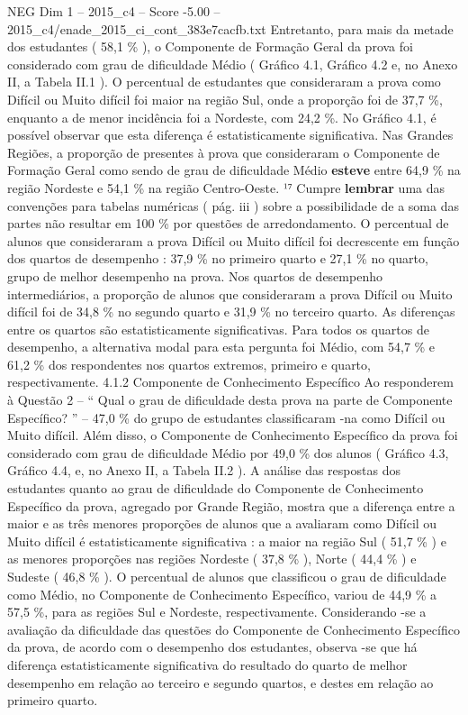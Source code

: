 \begin{textsample}{NEG Dim 1 – 2015\_c4 – Score -5.00 – 2015\_c4/enade\_2015\_ci\_cont\_383e7cacfb.txt}
Entretanto, para mais da metade dos estudantes ( 58,1 \% ), o Componente de Formação Geral da prova foi considerado com grau de dificuldade Médio ( Gráfico 4.1, Gráfico 4.2 e, no Anexo II, a Tabela II.1 ).
O percentual de estudantes que consideraram a prova como Difícil ou Muito difícil foi maior na região Sul, onde a proporção foi de 37,7 \%, enquanto a de menor incidência foi a Nordeste, com 24,2 \%.
No Gráfico 4.1, é possível observar que esta diferença é estatisticamente significativa.
Nas Grandes Regiões, a proporção de presentes à prova que consideraram o Componente de Formação Geral como sendo de grau de dificuldade Médio \textbf{esteve} entre 64,9 \% na região Nordeste e 54,1 \% na região Centro-Oeste. ¹⁷ Cumpre \textbf{lembrar} uma das convenções para tabelas numéricas ( pág. iii ) sobre a possibilidade de a soma das partes não resultar em 100 \% por questões de arredondamento.
O percentual de alunos que consideraram a prova Difícil ou Muito difícil foi decrescente em função dos quartos de desempenho : 37,9 \% no primeiro quarto e 27,1 \% no quarto, grupo de melhor desempenho na prova.
Nos quartos de desempenho intermediários, a proporção de alunos que consideraram a prova Difícil ou Muito difícil foi de 34,8 \% no segundo quarto e 31,9 \% no terceiro quarto.
As diferenças entre os quartos são estatisticamente significativas.
Para todos os quartos de desempenho, a alternativa modal para esta pergunta foi Médio, com 54,7 \% e 61,2 \% dos respondentes nos quartos extremos, primeiro e quarto, respectivamente. 4.1.2 Componente de Conhecimento Específico Ao responderem à Questão 2 – “ Qual o grau de dificuldade desta prova na parte de Componente Específico? ” – 47,0 \% do grupo de estudantes classificaram -na como Difícil ou Muito difícil.
Além disso, o Componente de Conhecimento Específico da prova foi considerado com grau de dificuldade Médio por 49,0 \% dos alunos ( Gráfico 4.3, Gráfico 4.4, e, no Anexo II, a Tabela II.2 ).
A análise das respostas dos estudantes quanto ao grau de dificuldade do Componente de Conhecimento Específico da prova, agregado por Grande Região, mostra que a diferença entre a maior e as três menores proporções de alunos que a avaliaram como Difícil ou Muito difícil é estatisticamente significativa : a maior na região Sul ( 51,7 \% ) e as menores proporções nas regiões Nordeste ( 37,8 \% ), Norte ( 44,4 \% ) e Sudeste ( 46,8 \% ).
O percentual de alunos que classificou o grau de dificuldade como Médio, no Componente de Conhecimento Específico, variou de 44,9 \% a 57,5 \%, para as regiões Sul e Nordeste, respectivamente.
Considerando -se a avaliação da dificuldade das questões do Componente de Conhecimento Específico da prova, de acordo com o desempenho dos estudantes, observa -se que há diferença estatisticamente significativa do resultado do quarto de melhor desempenho em relação ao terceiro e segundo quartos, e destes em relação ao primeiro quarto.

\end{textsample}
